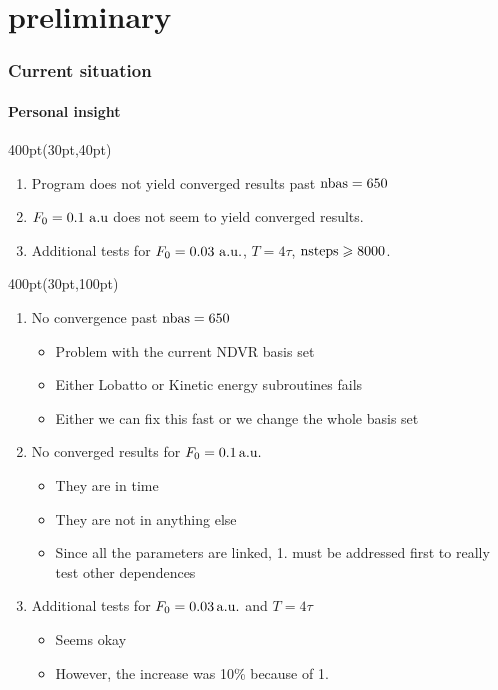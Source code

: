 \section{preliminary}

\begin{frame}
\frametitle{Current situation}
	\framesubtitle{Personal insight}
\footnotesize


\begin{textblock*}{400pt}(30pt,40pt)

\begin{enumerate}
\footnotesize
\item Program does not yield converged results past ${\rm nbas}=650$
\item $F_0 = 0.1\ \rm a.u$ does not seem to yield converged results. 
\item Additional tests for $F_0 = 0.03\ \rm a.u.$, 
      $T=4\tau$, ${\rm nsteps} \geqslant 8000$.
\end{enumerate}
\end{textblock*}


\begin{textblock*}{400pt}(30pt,100pt)
  \begin{enumerate}
  \footnotesize
\item No convergence past ${\rm nbas}=650$
  \begin{itemize}
  \footnotesize
    \item[$\bullet$] Problem with the current NDVR basis set 
    \item[$\bullet$] Either Lobatto or Kinetic energy subroutines fails
    \item[$\bullet$] Either we can fix this fast 
              or we change the whole basis set
  \end{itemize}
\item No converged results for $F_0 = 0.1\,\rm a.u.$
  \begin{itemize}
  \footnotesize
    \item[$\bullet$] They are in time
    \item[$\bullet$] They are not in anything else
    \item[$\bullet$] Since all the parameters are linked, 
              1. must be addressed first to really test other dependences
  \end{itemize}
\item Additional tests for $F_0 = 0.03\,\rm a.u.$ and $T=4\tau$
  \begin{itemize}
  \footnotesize
    \item[$\bullet$] Seems okay
    \item[$\bullet$] However, the increase was 10\% because of 1.
  \end{itemize}
  \end{enumerate}


\end{textblock*}
\end{frame}
